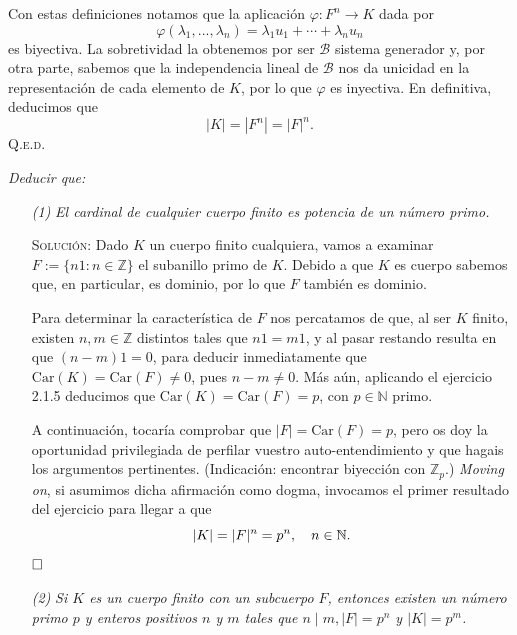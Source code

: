 \documentclass{article}
\newcommand{\car}{\text{Car}}
\begin{document}
\begin{enumerate}
    Con estas definiciones notamos que la aplicación $\varphi : F^n \to K$ dada por \[\varphi(\lambda_1, ..., \lambda_n) = \lambda_1u_1 + \cdots + \lambda_nu_n\] es biyectiva. La sobretividad la obtenemos por ser $\mathcal{B}$ sistema generador y, por otra parte, sabemos que la independencia lineal de $\mathcal{B}$ nos da unicidad en la representación de cada elemento de $K$, por lo que $\varphi$ es inyectiva. En definitiva, deducimos que \[|K| = |F^n| = |F|^n.\] \hfill{\textsc{Q.e.d.}}

    \vspace{7px}

    \textit{Deducir que:}

    \begin{itemize}
        \item[\textit{(1)}] \textit{El cardinal de cualquier cuerpo finito es potencia de un número primo.}

        \vspace{7px}

        \textsc{Solución}: Dado $K$ un cuerpo finito cualquiera, vamos a examinar $F := \{n1 : n \in \mathbb{Z}\}$ el subanillo primo de $K$. Debido a que $K$ es cuerpo sabemos que, en particular, es dominio, por lo que $F$ también es dominio.

        Para determinar la característica de $F$ nos percatamos de que, al ser $K$ finito, existen $n, m \in \mathbb{Z}$ distintos tales que $n1 = m1$, y al pasar restando resulta en que $(n - m)1 = 0$, para deducir inmediatamente que $\car(K) = \car(F) \neq 0$, pues $n - m \neq 0$. Más aún, aplicando el ejercicio 2.1.5 deducimos que $\car(K) = \car(F) = p$, con $p \in \mathbb{N}$ primo.

        A continuación, tocaría comprobar que $|F| = \car(F) = p$, pero os doy la oportunidad privilegiada de perfilar vuestro auto-entendimiento y que hagais los argumentos pertinentes. (Indicación: encontrar biyección con $\mathbb{Z}_p$.) \textit{Moving on}, si asumimos dicha afirmación como dogma, invocamos el primer resultado del ejercicio para llegar a que \[|K| = |F|^n = p^n, \hspace{10px} n \in \mathbb{N}.\] $\hfill\square$ 

        \vspace{7px}

        \item[\textit{(2)}] \textit{Si $K$ es un cuerpo finito con un subcuerpo $F$, entonces existen un número primo $p$ y enteros positivos $n$ y $m$ tales que $n \mid m, |F| = p^n$ y $|K| = p^m$.}


\end{itemize}
\end{enumerate}
\end{document}
